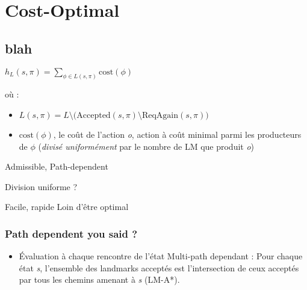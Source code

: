 \section{Cost-Optimal}
  \subsection*{blah}

\begin{frame}
  \begin{block}{}
     
  \end{block}

  \begin{block}{}
      \begin{center}
        $h_L(s, \pi) = \sum_{\phi \in L(s, \pi)} \text{cost}(\phi)$
      \end{center}
      
      où :
    \begin{itemize}
      \item $L(s, \pi) = L \setminus \big(\text{Accepted}(s, \pi) \setminus \text{ReqAgain}(s, \pi)\big)$
      \item $\text{cost}(\phi)$, le coût de l'action \emph{o}, action à coût minimal parmi les producteurs de  $\phi$ (\emph{divisé uniformément} par le nombre de LM que produit \emph{o})
    \end{itemize}
    \alert{Admissible, Path-dependent}
  \end{block}
  
  \begin{block}{Division uniforme ?}
    \begin{itemize}
      \proitem Facile, rapide
      \conitem Loin d'être optimal
    \end{itemize}
  \end{block}
\end{frame}

\begin{frame}
  \frametitle{Path dependent you said ?}

  \begin{block}{}
    \begin{itemize}
      \item Évaluation à chaque rencontre de l'état
      \thusitem Multi-path dependant : Pour chaque état \emph{s}, l'ensemble des landmarks acceptés est l'intersection de ceux acceptés par tous les chemins amenant à \emph{s} (LM-A*).
    \end{itemize}
  \end{block}
\end{frame}
  
